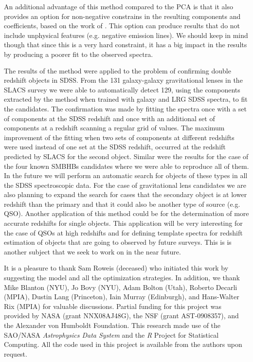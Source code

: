 \documentclass[12pt,preprint]{aastex}
\newcommand{\project}[1]{\textsl{#1}}
\begin{document}
An additional advantage of this method compared to the PCA is that it also provides an option for non-negative constrains in the resulting components and coefficients, based on the work of \cite{blanton}. This option can produce results that do not include unphysical features (e.g. negative emission lines). We should keep in mind though that since this is a very hard constraint, it has a big impact in the results by producing a poorer fit to the observed spectra.

The results of the method were applied to the problem of confirming
double redshift objects in SDSS. From the 131 galaxy-galaxy
gravitational lenses in the SLACS survey we were able to automatically
detect 129, using the components extracted by the method when trained
with galaxy and LRG SDSS spectra, to fit the candidates. The
confirmation was made by fitting the spectra once with a set of
components at the SDSS redshift and once with an additional set of
components at a redshift scanning a regular grid of values. The
maximum improvement of the fitting when two sets of components at
different redshifts were used instead of one set at the SDSS redshift,
occurred at the redshift predicted by SLACS for the second
object. Similar were the results for the case of the four known SMBHBs
candidates where we were able to reproduce all of them. In the future
we will perform an automatic search for objects of these types in all
the SDSS spectroscopic data. For the case of gravitational lens
candidates we are also planning to expand the search for cases that
the secondary object is at lower redshift than the primary and that it
could also be another type of source (e.g. QSO). Another application
of this method could be for the determination of more accurate
redshifts for single objects. This application will be very
interesting for the case of QSOs at high redshifts and for defining
template spectra for redshift estimation of objects that are going to
observed by future surveys. This is is another subject that we seek to
work on in the near future.

\acknowledgments It is a pleasure to thank Sam Roweis (deceased) who
initiated this work by suggesting the model and all the optimization
strategies.  In addition, we thank Mike Blanton (NYU), Jo Bovy (NYU),
Adam Bolton (Utah), Roberto Decarli (MPIA), Dustin Lang (Princeton),
Iain Murray (Edinburgh), and Hans-Walter Rix (MPIA) for valuable
discussions.  Partial funding for this project was provided by NASA
(grant NNX08AJ48G), the NSF (grant AST-0908357), and the Alexander von
Humboldt Foundation.  This research made use of the SAO/NASA
\project{Astrophysics Data System} and the \project{R} Project for
Statistical Computing.  All the code used in this project is available
from the authors upon request.
\end{document}
